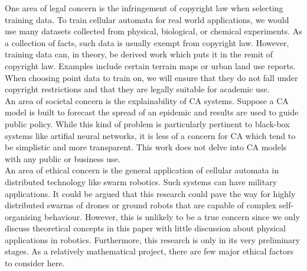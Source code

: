 One area of legal concern is the infringement of copyright law when selecting training data. To train cellular automata for real world applications, we would use many datasets collected from physical, biological, or chemical experiments. As a collection of facts, such data is usually exempt from copyright law. However, training data can, in theory, be derived work which puts it in the remit of copyright law. Examples include certain terrain maps or urban land use reports. When choosing point data to train on, we will ensure that they do not fall under copyright restrictions and that they are legally suitable for academic use.\\

An area of societal concern is the explainability of CA systems. Suppose a CA model is built to forecast the spread of an epidemic and results are used to guide public policy. While this kind of problem is particularly pertinent to black-box systems like artifial neural networks, it is less of a concern for CA which tend to be simplistic and more transparent. This work does not delve into CA models with any public or business use.\\

An area of ethical concern is the general application of cellular automata in distributed technology like swarm robotics. Such systems can have military applications. It could be argued that this research could pave the way for highly distributed swarms of drones or ground robots that are capable of complex self-organising behaviour. However, this is unlikely to be a true concern since we only discuss theoretical concepts in this paper with little discussion about physical applications in robotics. Furthermore, this research is only in its very preliminary stages. As a relatively mathematical project, there are few major ethical factors to consider here.\\